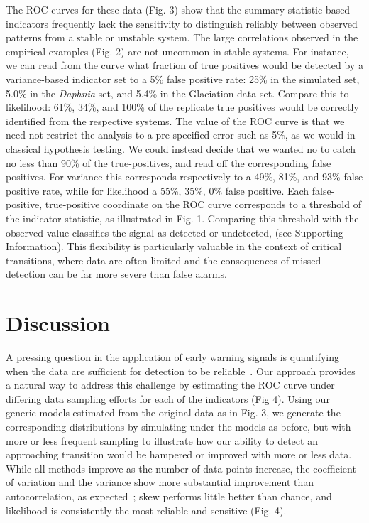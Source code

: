 \documentclass[authoryear,preprint,11pt]{elsarticle}
\begin{document}
The ROC curves for these data (Fig. 3) show that the summary-statistic based indicators 
frequently lack the sensitivity to distinguish reliably between observed patterns from a stable or unstable system. 
The large correlations observed in the empirical examples (Fig. 2) are not uncommon in stable systems. 
For instance, we can read from the curve what fraction of true positives would be detected by a variance-based indicator
set to a 5\% false positive rate:
25\% in the simulated set,
5.0\% in the \emph{Daphnia} set,
and 5.4\% in the Glaciation data set.
Compare this to likelihood: 61\%, 34\%, and 100\% of the replicate true positives
would be correctly identified from the respective systems.
The value of the ROC curve is that we need not restrict the analysis to a pre-specified error such as 5\%,
as we would in classical hypothesis testing.  
We could instead decide that we wanted no to catch no less than 90\% of the true-positives,
and read off the corresponding false positives.  
For variance this corresponds respectively to a 49\%, 81\%, and 93\% false positive rate,
while for likelihood a 55\%, 35\%, 0\% false positive.
Each false-positive, true-positive coordinate on the ROC curve corresponds to a threshold of the indicator statistic,
as illustrated in Fig. 1.  
Comparing this threshold with the observed value classifies the signal as detected or undetected, (see Supporting Information).
This flexibility is particularly valuable in the context of critical transitions, 
where data are often limited and the consequences of missed detection can be far more severe than false alarms.  



\section{Discussion}
A pressing question in the application of early warning signals is quantifying
when the data are sufficient for detection to be reliable~\citep{Scheffer2009, Scheffer2010, Inman2011}. 
Our approach provides a natural way to address this challenge by estimating the ROC curve under differing data sampling efforts
for each of the indicators (Fig 4). 
Using our generic models estimated from the original data as in Fig. 3, 
we generate the corresponding distributions by simulating under the models as before, 
but with more or less frequent sampling to illustrate how our ability to detect an approaching transition 
would be hampered or improved with more or less data.  
While all methods improve as the number of data points increase, 
the coefficient of variation and the variance show more substantial improvement than autocorrelation, 
as expected~\citep{Carpenter2011};⁠
skew performs little better than chance, and likelihood is consistently the most reliable and sensitive (Fig. 4). 
\end{document}
